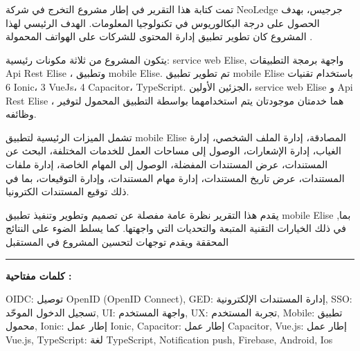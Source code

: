 \begin{Arabic}  تمت كتابة هذا التقرير في إطار مشروع التخرج في شركة NeoLedge جرجيس، بهدف الحصول على درجة البكالوريوس في تكنولوجيا المعلومات. الهدف الرئيسي لهذا المشروع كان تطوير تطبيق إدارة المحتوى للشركات على الهواتف المحمولة .

يتكون المشروع من ثلاثة مكونات رئيسية: service web Elise, واجهة برمجة التطبيقات Api Rest Elise ، وتطبيق mobile Elise. تم تطوير تطبيق mobile Elise باستخدام تقنيات 6 Ionic، 3 VueJs، 4 Capacitor، TypeScript. الجزئين الأولين، service web Elise و Api Rest Elise ، هما خدمتان موجودتان يتم استخدامهما بواسطة التطبيق المحمول لتوفير وظائفه.

تشمل الميزات الرئيسية لتطبيق mobile Elise المصادقة، إدارة الملف الشخصي، إدارة الغياب، إدارة الإشعارات، الوصول إلى مساحات العمل للخدمات المختلفة، البحث عن المستندات، عرض المستندات المفضلة، الوصول إلى المهام الخاصة، إدارة ملفات المستندات، عرض تاريخ المستندات، إدارة مهام المستندات، وإدارة التوقيعات، بما في ذلك توقيع المستندات الكترونيا.

يقدم هذا التقرير نظرة عامة مفصلة عن تصميم وتطوير وتنفيذ تطبيق mobile Elise ,بما في ذلك الخيارات التقنية المتبعة والتحديات التي واجهتها. كما يسلط الضوء على النتائج المحققة ويقدم توجهات لتحسين المشروع في المستقبل
\end{Arabic}

\noindent\rule[2pt]{\textwidth}{0.5pt}


\begin{Arabic}
\textbf{كلمات مفتاحية :}

OIDC: توصيل OpenID (OpenID Connect), GED: إدارة المستندات الإلكترونية, SSO: تسجيل الدخول الموحّد, UI: واجهة المستخدم, UX: تجربة المستخدم, Mobile: تطبيق محمول, Ionic: إطار عمل Ionic, Capacitor: إطار عمل Capacitor, Vue.js: إطار عمل Vue.js, TypeScript: لغة TypeScript, Notification push, Firebase, Android, Ios
\end{Arabic}


